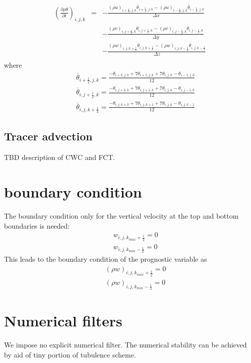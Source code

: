 \begin{eqnarray}
\left(\frac{\partial \rho \theta}{\partial t}\right)_{i,j,k}
&=& - \frac{(\rho u)_{i+\frac{1}{2},j,k} \overline{\theta}_{i+\frac{1}{2},j,k} 
           -(\rho u)_{i-\frac{1}{2},j,k} \overline{\theta}_{i-\frac{1}{2},j,k}}
     {\Delta x}\nonumber\\
& &  - \frac{(\rho v)_{i,j+\frac{1}{2},k} \overline{\theta}_{i,j+\frac{1}{2},k} 
           -(\rho v)_{i,j-\frac{1}{2},k} \overline{\theta}_{i,j-\frac{1}{2},k}}
     {\Delta y}\nonumber\\
& &  - \frac{(\rho w)_{i,j,k+\frac{1}{2}} \overline{\theta}_{i,j,k+\frac{1}{2}} 
           -(\rho w)_{i,j,k-\frac{1}{2}} \overline{\theta}_{i,j,k-\frac{1}{2}}}
     {\Delta z}\nonumber\\
\end{eqnarray}
where
\begin{eqnarray}
&& \overline{\theta}_{i+\frac{1}{2},j,k} = 
\frac{-\theta_{i+2,j,k}+7\theta_{i+1,j,k}+7\theta_{i,j,k}-\theta_{i-1,j,k}}{12}\\
&& \overline{\theta}_{i,j+\frac{1}{2},k} = 
\frac{-\theta_{i,j+2,k}+7\theta_{i,j+1,k}+7\theta_{i,j,k}-\theta_{i,j-1,k}}{12}\\
&& \overline{\theta}_{i,j,k+\frac{1}{2}} = 
\frac{-\theta_{i,j,k+2}+7\theta_{i,j,k+1}+7\theta_{i,j,k}-\theta_{i,j,k-1}}{12}
\end{eqnarray}

\subsection{Tracer advection}
{\Huge TBD}
description of CWC and FCT. 

\section{boundary condition}
The boundary condition only for the vertical velocity at the top and bottom
boundaries is needed:
\begin{eqnarray}
&&  w_{i,j,k_{max}+\frac{1}{2}} = 0\\
&&  w_{i,j,k_{min}-\frac{1}{2}} = 0
\end{eqnarray}
This leads to the boundary condition of the prognostic variable as
\begin{eqnarray}
&&  (\rho w)_{i,j,k_{max}+\frac{1}{2}} = 0\\
&&  (\rho w)_{i,j,k_{min}-\frac{1}{2}} = 0
\end{eqnarray}



\section{Numerical filters}

We impose no explicit numerical filter.
The numerical stability can be achieved
by aid of tiny portion of tubulence scheme.

